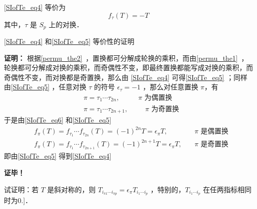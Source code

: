 \autoref{SIofTe_eq4} 等价为
\begin{equation}\label{SIofTe_eq5}
f_\tau(T)=-T
\end{equation}
其中，$\tau$ 是 $S_p$ 上的对换．
\begin{example}{}
\autoref{SIofTe_eq4} 和\autoref{SIofTe_eq5} 等价性的证明

\textbf{证明：}
根据\autoref{permu_the2}~，置换都可分解成轮换的乘积，而由\autoref{permu_the1}~，轮换都可分解成对换的乘积，而奇偶性不变，即最终置换都能写成对换的乘积，而奇偶性不变，而对换都是奇置换，那么由 \autoref{SIofTe_eq4} 可得\autoref{SIofTe_eq5} ；同样由\autoref{SIofTe_eq5} ，任意对换 $\tau$ 的符号 $\epsilon_\tau=-1$ ，那么对任意置换 $\pi$，有
\begin{equation}
\begin{aligned}
&\pi=\tau_1\cdots\tau_{2n}, \quad &\text{ $\pi$ 为偶置换}\\
&\pi=\tau_1\cdots\tau_{2n+1}, &\quad \text{ $\pi$ 为奇置换}
\end{aligned}
\end{equation}
于是由\autoref{SIofTe_eq6} 和\autoref{SIofTe_eq5} 
\begin{equation}
\begin{aligned}
&f_\pi(T)=f_{\tau_1}\cdots f_{\tau_{2n}}(T)=(-1)^{2n}T=\epsilon_\pi T,\quad&\text{$\pi$ 是偶置换}\\
&f_\pi(T)=f_{\tau_1}\cdots f_{\tau_{2n+1}}(T)=(-1)^{2n+1}T=\epsilon_\pi T,\quad&\text{$\pi$ 是奇置换}
\end{aligned}
\end{equation}
即由\autoref{SIofTe_eq5} 得到\autoref{SIofTe_eq4} 

\textbf{证毕！}

\end{example}






\begin{exercise}{}
试证明：若 $T$ 是斜对称的，则 $T_{i_{\pi1}\cdots i_{\pi p}}=\epsilon_\pi T_{i_1\cdots i_p}$ ，特别的，$ T_{i_1\cdots i_p}$ 在任两指标相同时为0.]．
\end{exercise}